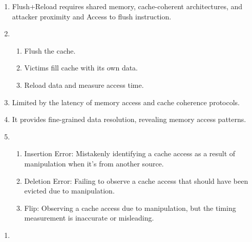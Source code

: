 \documentclass[sheet=2, prefix, english]{dexercise}
\begin{document}

\begin{enumerate}
  \item
  Flush+Reload requires shared memory, cache-coherent architectures, and attacker proximity and Access to flush instruction.
  \item
    \begin{enumerate}
      \item Flush the cache.
      \item Victims fill cache with its own data.
      \item Reload data and measure access time.
    \end{enumerate}
  \item Limited by the latency of memory access and cache coherence protocols. 
  \item It provides fine-grained data resolution, revealing memory access patterns.
  \item
  \begin{enumerate}
    \item Insertion Error: Mistakenly identifying a cache access as a result of manipulation when it's from another source.
    \item Deletion Error: Failing to observe a cache access that should have been evicted due to manipulation.
    \item Flip: Observing a cache access due to manipulation, but the timing measurement is inaccurate or misleading.
  \end{enumerate}

\end{enumerate}


\begin{enumerate}
  \item
\end{enumerate}

\end{document}

